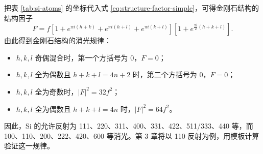 把表 \ref{tab:si-atoms} 的坐标代入式 \eqref{eq:structure-factor-simple}，可得金刚石结构的结构因子
\begin{equation}
F=f\left[1+e^{\pi i(h+k)}+e^{\pi i(h+l)}+e^{\pi i(k+l)}\right]
\left[1+e^{\frac{\pi i}{2}(h+k+l)}\right].
\label{eq:diamond-F}
\end{equation}
由此得到金刚石结构的消光规律：
\begin{itemize}[leftmargin=2em,itemsep=1pt]
  \item $h,k,l$ 奇偶混合时，第一个方括号为 0，$F=0$；
  \item $h,k,l$ 全为偶数且 $h+k+l=4n+2$ 时，第二个方括号为 0，$F=0$；
  \item $h,k,l$ 全为奇数时，$|F|^2=32f^2$；
  \item $h,k,l$ 全为偶数且 $h+k+l=4n$ 时，$|F|^2=64f^2$。
\end{itemize}
因此，Si 的允许反射为 111、220、311、400、331、422、511/333、440 等，而 100、110、200、222、420、600 等消光。第 3 章将以 110 反射为例，用模板计算验证这一规律。
